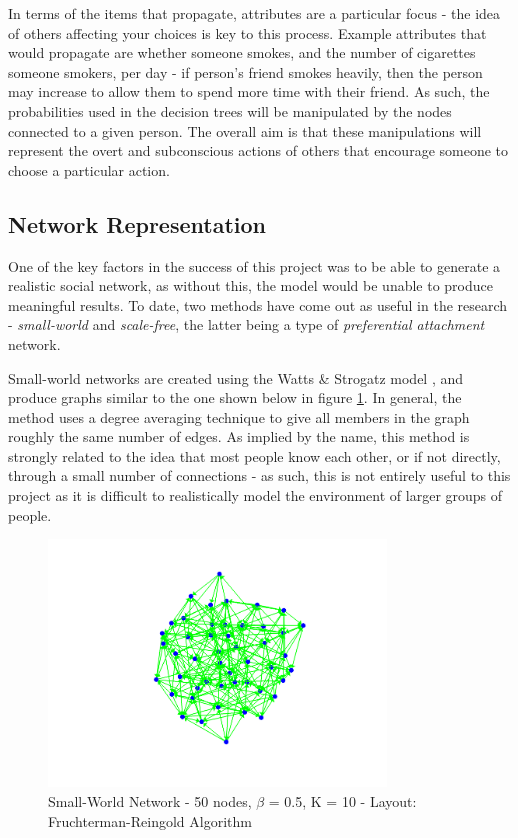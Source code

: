 \documentclass[]{article}
\begin{document}
In terms of the items that propagate, attributes are a particular focus - the idea of others affecting your choices is key to this process. Example attributes that would propagate are whether someone smokes, and the number of cigarettes someone smokers, per day - if person's friend smokes heavily, then the person may increase to allow them to spend more time with their friend. As such, the probabilities used in the decision trees will be manipulated by the nodes connected to a given person. The overall aim is that these manipulations will represent the overt and subconscious actions of others that encourage someone to choose a particular action.

\subsection{Network Representation}
One of the key factors in the success of this project was to be able to generate a realistic social network, as without this, the model would be unable to produce meaningful results. To date, two methods have come out as useful in the research - \emph{small-world} and \emph{scale-free}, the latter being a type of \emph{preferential attachment} network.

Small-world networks are created using the Watts \& Strogatz model \cite{WSTech}, and produce graphs similar to the one shown below in figure \ref{fig:small-world}. In general, the method uses a degree averaging technique to give all members in the graph roughly the same number of edges. As implied by the name, this method is strongly related to the idea that most people know each other, or if not directly, through a small number of connections - as such, this is not entirely useful to this project as it is difficult to realistically model the environment of larger groups of people. 

\begin{figure}
	\centering
		\includegraphics[width=0.80\textwidth]{small-world.png}
	\caption{Small-World Network - 50 nodes, $\beta$ = 0.5, K = 10 - Layout: Fruchterman-Reingold Algorithm}
	\label{fig:small-world}
\end{figure}
\end{document}
